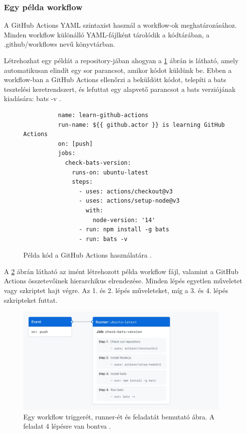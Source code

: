 \subsubsection*{Egy példa workflow}
A GitHub Actions YAML szintaxist használ a workflow-ok meghatározásához.
Minden workflow különálló YAML-fájlként tárolódik a kódtárában, a .github/workflows nevű könyvtárban.

Létrehozhat egy példát a repository-jában ahogyan a \ref{sample-actions-config} ábrán is látható, amely automatikusan elindít egy sor parancsot, amikor kódot küldünk be.
Ebben a workflow-ban a GitHub Actions ellenőrzi a beküldött kódot, telepíti a bats tesztelési keretrendszert, és lefuttat egy alapvető parancsot a bats verziójának kiadására: bats -v \cite{github}.

\begin{figure}
  \centering
    \begin{minipage}{\linewidth}
      \begin{lstlisting}
          name: learn-github-actions
          run-name: ${{ github.actor }} is learning GitHub Actions
          on: [push]
          jobs:
            check-bats-version:
              runs-on: ubuntu-latest
              steps:
                - uses: actions/checkout@v3
                - uses: actions/setup-node@v3
                  with:
                    node-version: '14'
                - run: npm install -g bats
                - run: bats -v
      \end{lstlisting}
      \end{minipage}
  \caption{Példa kód a GitHub Actions használatára \cite{github}.}
  \label{sample-actions-config}
\end{figure}

A \ref{overview-actions-event} ábrán látható az imént létrehozott példa workflow fájl, valamint a GitHub Actions összetevőinek hierarchikus elrendezése.
Minden lépés egyetlen műveletet vagy szkriptet hajt végre.
Az 1. és 2. lépés műveleteket, míg a 3. és 4. lépés szkripteket futtat.

\begin{figure}[ht]
    \centering
         \includegraphics[width=0.95\textwidth]{figures/github/overview-actions-event.png}
          \caption{Egy workflow triggerét, runner-ét és feladatát bemutató ábra. A feladat 4 lépésre van bontva \cite{github}.}
           \label{overview-actions-event}
\end{figure}